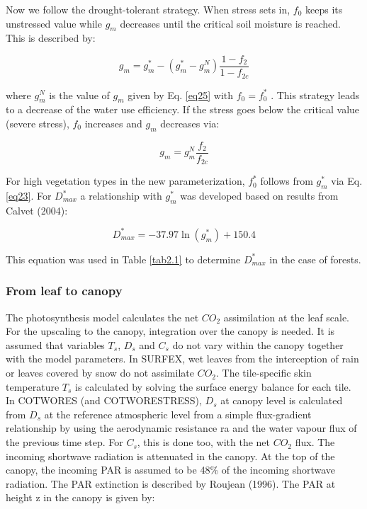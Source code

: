 {Now we follow the drought-tolerant strategy. When stress sets in, $f_{0}$ keeps its unstressed value while
$g_{m}$ decreases until the critical soil moisture is reached. This is described by:

\begin{equation}
g_{m} = g_{m}^{*}-(g_{m}^{*}-g_{m}^{N})\frac{1-f_{2}}{1-f_{2c}}
\end{equation}


where $g_{m}^{N}$ is the value of $g_{m}$ given by Eq. \ref{eq25} with $f_{0}=f_{0}^{*}$ . This strategy leads to a decrease of the water
use efficiency. If the stress goes below the critical value (severe stress), $f_{0}$ increases and $g_{m}$ decreases
via:

\begin{equation}
g_{m} = g_{m}^{N}\frac{f_{2}}{f_{2c}}
\end{equation}

For high vegetation types in the new parameterization, $f_{0}^{*}$ follows from $g_{m}^{*}$ via Eq. \ref{eq23}. For $D_{max}^{*}$ a
relationship with $g_{m}^{*}$ was developed based on results from Calvet \etal (2004):

\begin{equation}\label{eq29}
D_{max}^{*} = -37.97\ln(g_{m}^{*})+150.4
\end{equation}

This equation was used in Table \ref{tab2.1} to determine $D_{max}^{*}$ in the case of forests.

\subsubsection{From leaf to canopy}
\label{sec1.5}

The photosynthesis model calculates the net $CO_{2}$ assimilation at the leaf scale. For the upscaling to
the canopy, integration over the canopy is needed. It is assumed that variables $T_{s}$, $D_{s}$ and $C_{s}$ do not
vary within the canopy together with the model parameters. In SURFEX, wet leaves from the
interception of rain or leaves covered by snow do not assimilate $CO_{2}$. The tile-specific skin
temperature $T_{s}$ is calculated by solving the surface energy balance for each tile. In COTWORES (and
COTWORESTRESS), $D_{s}$ at canopy level is calculated from $D_{s}$ at the reference atmospheric level from
a simple flux-gradient relationship by using the aerodynamic resistance ra and the water vapour flux of
the previous time step. For $C_{s}$, this is done too, with the net $CO_{2}$ flux.
The incoming shortwave radiation is attenuated in the canopy. At the top of the canopy, the incoming
PAR is assumed to be 48\% of the incoming shortwave radiation. The PAR extinction is described by
Roujean (1996)\nocite{Roujean1996}. The PAR at height z in the canopy is given by:

}
